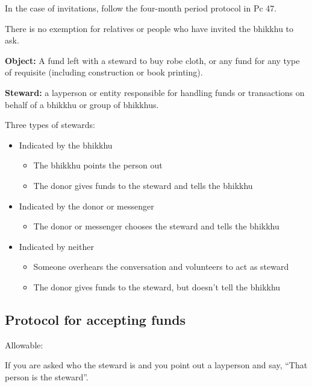 In the case of invitations, follow the four-month period protocol in Pc
47.

There is no exemption for relatives or people who have invited the
bhikkhu to ask.

\textbf{Object:} A fund left with a steward to buy robe cloth, or any
fund for any type of requisite (including construction or book
printing).

\textbf{Steward:} a layperson or entity responsible for handling funds
or transactions on behalf of a bhikkhu or group of bhikkhus.

Three types of stewards:

\enlargethispage*{\baselineskip}

\begin{itemize}
\tightlist
\item
  Indicated by the bhikkhu

  \begin{itemize}
  \tightlist
  \item
    The bhikkhu points the person out
  \item
    The donor gives funds to the steward and tells the bhikkhu
  \end{itemize}
\item
  Indicated by the donor or messenger

  \begin{itemize}
  \tightlist
  \item
    The donor or messenger chooses the steward and tells the bhikkhu
  \end{itemize}
\item
  Indicated by neither

  \begin{itemize}
  \tightlist
  \item
    Someone overhears the conversation and volunteers to act as steward
  \item
    The donor gives funds to the steward, but doesn't tell the bhikkhu
  \end{itemize}
\end{itemize}

\clearpage

\subsection{Protocol for accepting funds}

Allowable:

If you are asked who the steward is and you point out a layperson and
say, ``That person is the steward''.

